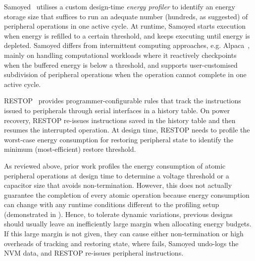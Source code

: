 Samoyed~\cite{maeng2019supporting} utilises a custom design-time \textit{energy profiler} to identify an energy storage size that suffices to run an adequate number (hundreds, as suggested) of peripheral operations in one active cycle. 
At runtime, Samoyed starts execution when energy is refilled to a certain threshold, and keeps executing until energy is depleted. 
Samoyed differs from  intermittent computing approaches, e.g. Alpaca~\cite{maeng2017alpaca}, mainly on handling computational workloads where it reactively checkpoints when the buffered energy is below a threshold, and supports user-customised subdivision of peripheral operations when the operation cannot complete in one active cycle. 

RESTOP~\cite{rodriguez2018restop} provides programmer-configurable rules that track the instructions issued to peripherals through serial interfaces in a history table.
On power recovery, RESTOP re-issues instructions saved in the history table and then resumes the interrupted operation. 
At design time, RESTOP needs to profile the worst-case energy consumption for restoring peripheral state to identify the minimum (most-efficient) restore threshold. 




As reviewed above, prior work profiles the energy consumption of atomic peripheral operations at design time to determine a voltage threshold or a capacitor size that avoids non-termination. 
However, this does not actually guarantee the completion of every atomic operation because energy consumption can change with any runtime conditions different to the profiling setup (demonstrated in ). 
Hence, to tolerate dynamic variations, previous designs should usually leave an inefficiently large margin when allocating energy budgets. 
If this large margin is not given, they can cause either non-termination or high overheads of tracking and restoring state, where \debs{} fails, Samoyed undo-logs the NVM data, and RESTOP re-issues peripheral instructions. 



